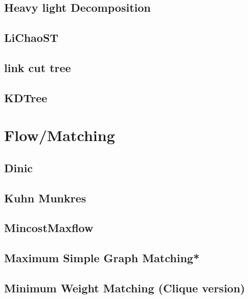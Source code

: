 \subsection{Heavy light Decomposition}

% 
\subsection{LiChaoST}

\subsection{link cut tree}

\subsection{KDTree}



\section{Flow/Matching}
\subsection{Dinic}

\subsection{Kuhn Munkres}

\subsection{MincostMaxflow}

\subsection{Maximum Simple Graph Matching*} %

\subsection{Minimum Weight Matching (Clique version)}

